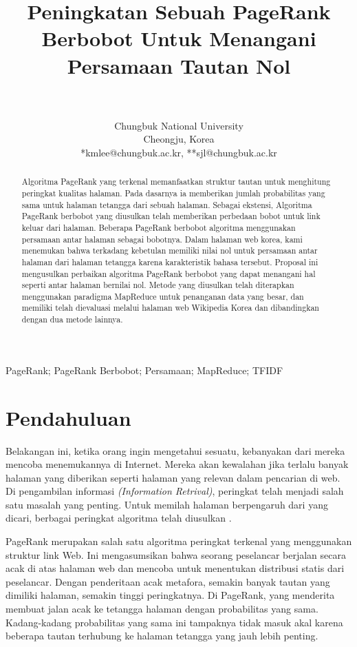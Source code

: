 \documentclass[conference]{IEEEtran}
\title{\textbf{Peningkatan Sebuah PageRank Berbobot Untuk Menangani Persamaan Tautan Nol}}
\author{\IEEEauthorblockN{Sang-yeon Lee*, Young-gi Kim*, Seok-Jong Lee**, Keon Myung Lee*}\\
\IEEEauthorblockA{*Department of Computer Science, **Department of Mathematics}\\
Chungbuk National University\\
Cheongju, Korea\\
*kmlee@chungbuk.ac.kr, **sjl@chungbuk.ac.kr}
\begin{document}
\maketitle

\begin{abstract}

    Algoritma PageRank yang terkenal memanfaatkan
struktur tautan untuk menghitung peringkat kualitas halaman. Pada dasarnya ia memberikan jumlah probabilitas yang sama untuk halaman tetangga dari sebuah halaman. Sebagai ekstensi, Algoritma PageRank berbobot yang diusulkan telah memberikan perbedaan bobot untuk link keluar dari halaman. Beberapa PageRank berbobot algoritma menggunakan persamaan antar halaman sebagai bobotnya. Dalam halaman web korea, kami menemukan bahwa terkadang kebetulan memiliki nilai nol untuk persamaan antar halaman dari halaman tetangga karena karakteristik bahasa tersebut. Proposal ini mengusulkan perbaikan algoritma PageRank berbobot yang dapat menangani hal seperti antar halaman bernilai nol. Metode yang diusulkan telah diterapkan menggunakan paradigma MapReduce untuk penanganan data yang besar, dan memiliki telah dievaluasi melalui halaman web Wikipedia Korea dan dibandingkan dengan dua metode lainnya.
\end{abstract}

\begin{IEEEkeywords}
    PageRank; PageRank Berbobot; Persamaan; MapReduce; TFIDF
\end{IEEEkeywords}

\section{Pendahuluan}

Belakangan ini, ketika orang ingin mengetahui sesuatu, kebanyakan dari mereka mencoba menemukannya di Internet. Mereka akan kewalahan jika terlalu banyak halaman yang diberikan seperti halaman yang relevan dalam pencarian di web. Di pengambilan informasi \textit{(Information Retrival)}, peringkat telah menjadi salah satu masalah yang penting. Untuk memilah halaman berpengaruh dari yang dicari, berbagai peringkat algoritma telah diusulkan \cite{brin1998anatomy, xing2004weighted, qiao2010simrank, page1999pagerank, kumar2013pagerank, duhan2009page, najork2007comparing, kumar2011page, nemirovsky2008weighted, tyagi2012weighted, haveliwala2003topic}.

PageRank\cite{brin1998anatomy} merupakan salah satu algoritma peringkat terkenal yang menggunakan struktur link Web. Ini mengasumsikan bahwa seorang peselancar berjalan secara acak di atas halaman web dan mencoba untuk menentukan distribusi statis dari peselancar. Dengan penderitaan acak metafora, semakin banyak tautan yang dimiliki halaman, semakin tinggi peringkatnya. Di PageRank, yang menderita membuat jalan acak ke tetangga halaman dengan probabilitas yang sama. Kadang-kadang probabilitas yang sama ini tampaknya tidak masuk akal karena beberapa tautan terhubung ke halaman tetangga yang jauh lebih penting.
\end{document}
